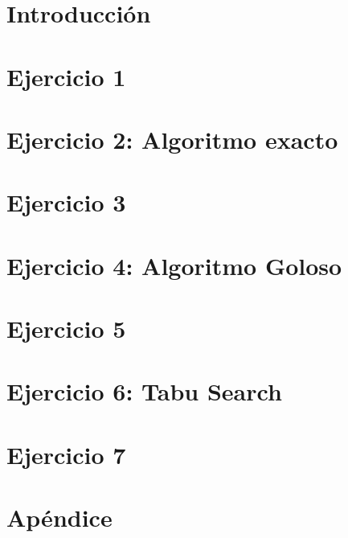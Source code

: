 \documentclass[hidelinks,a4paper,12pt, nofootinbib]{article}
\begin{document}
\maketitle

\tableofcontents
\newpage

\section{Introducción}

\newpage

\section{Ejercicio 1}

\newpage

\section{Ejercicio 2: Algoritmo exacto}

\newpage

\section{Ejercicio 3}

\newpage


\section{Ejercicio 4: Algoritmo Goloso}

\newpage


\section{Ejercicio 5}

\newpage

\section{Ejercicio 6: Tabu Search}

\newpage

\section{Ejercicio 7}

\newpage


\setcounter{section}{0}
\renewcommand{\thesection}{\Alph{section}}
\section{Apéndice}


\newpage
\printbibliography
\end{document}
